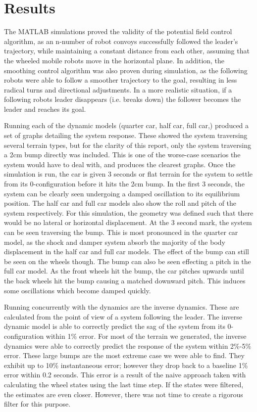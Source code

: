 \chapter{Results}
The MATLAB simulations proved the validity of the potential field control algorithm, as an n-number of robot convoys successfully followed the leader's trajectory, while maintaining a constant distance from each other, assuming that the wheeled mobile robots move in the horizontal plane. In addition, the smoothing control algorithm was also proven during simulation, as the following robots were able to follow a smoother trajectory to the goal, resulting in less radical turns and directional adjustments. In a more realistic situation, if a following robots leader disappears (i.e. breaks down) the follower becomes the leader and reaches its goal.

Running each of the dynamic models (quarter car, half car, full car,) produced a set of graphs detailing the system response. These showed the system traversing several terrain types, but for the clarity of this report, only the system traversing a 2cm bump directly was included. This is one of the worse-case scenarios the system would have to deal with, and produces the clearest graphs. Once the simulation is run, the car is given 3 seconds or flat terrain for the system to settle from its 0-configuration before it hits the 2cm bump. In the first 3 seconds, the system can be clearly seen undergoing a damped oscillation to its equilibrium position. The half car and full car models also show the roll and pitch of the system respectively. For this simulation, the geometry was defined such that there would be no lateral or horizontal displacement. At the 3 second mark, the system can be seen traversing the bump. This is most pronounced in the quarter car model, as the shock and damper system absorb the majority of the body displacement in the half car and full car models. The effect of the bump can still be seen on the wheels though. The bump can also be seen effecting a pitch in the full car model. As the front wheels hit the bump, the car pitches upwards until the back wheels hit the bump causing a matched downward pitch. This induces some oscillations which become damped quickly.

Running concurrently with the dynamics are the inverse dynamics. These are calculated from the point of view of a system following the leader. The inverse dynamic model is able to correctly predict the sag of the system from its 0-configuration within 1\% error. For most of the terrain we generated, the inverse dynamics were able to correctly predict the response of the system within 2\%-5\% error. These large bumps are the most extreme case we were able to find. They exhibit up to 10\% instantaneous error; however they drop back to a baseline 1\% error within 0.2 seconds. This error is a result of the naive approach taken with calculating the wheel states using the last time step. If the states were filtered, the estimates are even closer. However, there was not time to create a rigorous filter for this purpose.

